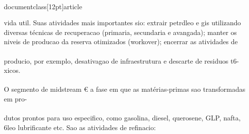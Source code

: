 \\documentclass[12pt]{article}
\begin{document}
vida util. Suas atividades mais importantes sio: extrair petrdleo e gis utilizando\\
diversas técnicas de recuperacao (primaria, secundaria e avangada); manter os\\
niveis de producao da reserva otimizados (workover); encerrar as atividades de\\
\\
producio, por exemplo, desativagao de infraestrutura e descarte de residuos t6-\\
xicos.\\
\\
O segmento de midstream € a fase em que as matérias-primas sao transformadas em pro-\\
\\
dutos prontos para uso especifico, como gasolina, diesel, querosene, GLP, nafta,\\
6leo lubrificante etc. Sao as atividades de refinacio:\\
\\
\end{document}
